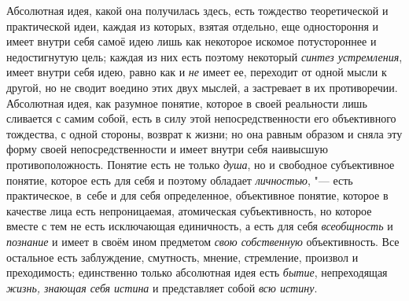 Абсолютная идея, какой она получилась здесь, есть тождество
теоретической и практической идеи, каждая из которых, взятая отдельно, еще
одностороння и имеет внутри себя самоё идею лишь как некоторое искомое
потустороннее и недостигнутую цель; каждая из них есть поэтому некоторый
{\em синтез устремления},
имеет внутри себя идею, равно как и
{\em не} имеет ее,
переходит от одной мысли к другой, но не сводит воедино этих двух мыслей, а
застревает в их противоречии. Абсолютная идея, как разумное понятие,
которое в своей реальности лишь сливается с самим собой, есть в силу этой
непосредственности его объективного тождества, с одной стороны, возврат к
жизни; но она равным образом и сняла эту форму своей непосредственности и
имеет внутри себя наивысшую противоположность. Понятие есть не только
{\em душа}, но и
свободное субъективное понятие, которое есть для себя и поэтому обладает
{\em личностью}, "--- есть
практическое, в~себе и для себя определенное, объективное понятие, которое
в качестве лица есть непроницаемая, атомическая субъективность, но которое
вместе с тем не есть исключающая единичность, а есть для себя
{\em всеобщность} и
{\em познание} и имеет в
своём ином предметом {\em свою
собственную} объективность. Все остальное есть заблуждение,
смутность, мнение, стремление, произвол и преходимость; единственно только
абсолютная идея есть {\em бытие},
непреходящая {\em жизнь,
знающая себя истина} и представляет собой
{\em всю истину}.

